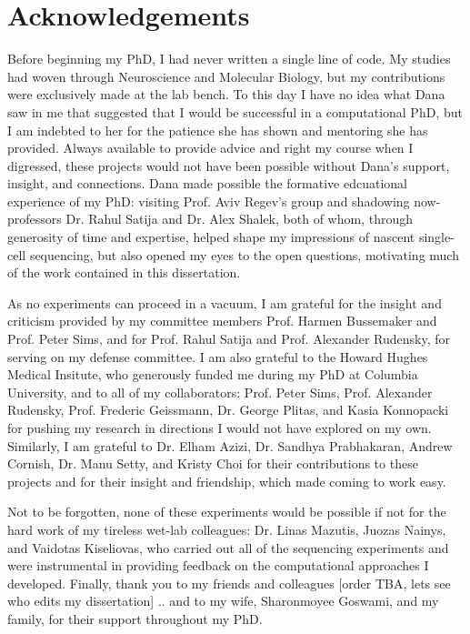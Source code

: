
\cleartorecto %
\chapter{Acknowledgements} %
\thispagestyle{plain} %

Before beginning my PhD, I had never written a single line of code. 
My studies had woven through Neuroscience and Molecular Biology, but my contributions were exclusively made at the lab bench.  
To this day I have no idea what Dana saw in me that suggested that I would be successful in a computational PhD, but I am indebted to her for the patience she has shown and mentoring she has provided. 
Always available to provide advice and right my course when I digressed, these projects would not have been possible without Dana's support, insight, and connections.
Dana made possible the formative edcuational experience of my PhD: visiting Prof. Aviv Regev's group and shadowing now-professors Dr. Rahul Satija and Dr. Alex Shalek, both of whom, through generosity of time and expertise, helped shape my impressions of nascent single-cell sequencing, but also opened my eyes to the open questions, motivating much of the work contained in this dissertation. %

As no experiments can proceed in a vacuum, I am grateful for the insight and criticism provided by my committee members Prof. Harmen Bussemaker and Prof. Peter Sims, and for Prof. Rahul Satija and Prof. Alexander Rudensky, for serving on my defense committee.    
I am also grateful to the Howard Hughes Medical Insitute, who generously funded me during my PhD at Columbia University, and to all of my collaborators: Prof. Peter Sims, Prof. Alexander Rudensky, Prof. Frederic Geissmann, Dr. George Plitas, and Kasia Konnopacki for pushing my research in directions I would not have explored on my own.  
Similarly, I am grateful to Dr. Elham Azizi, Dr. Sandhya Prabhakaran, Andrew Cornish, Dr. Manu Setty, and Kristy Choi for their contributions to these projects and for their insight and friendship, which made coming to work easy.  

Not to be forgotten, none of these experiments would be possible if not for the hard work of my tireless wet-lab colleagues: Dr. Linas Mazutis, Juozas Nainys, and Vaidotas Kiseliovas, who carried out all of the sequencing experiments and were instrumental in providing feedback on the computational approaches I developed. 
Finally, thank you to my friends and colleagues [order TBA, lets see who edits my dissertation] .. and to my wife, Sharonmoyee Goswami, and my family, for their support throughout my PhD. 
